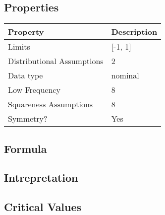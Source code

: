 \documentclass[11pt]{article}
\begin{document}
\subsection{Properties}
\begin{tabular}{| l || l |}
    \hline
    {\bf Property} & {\bf Description} \\
    \hline
    Limits & [-1, 1] \\ \hline

    Distributional Assumptions& 2 \\ \hline

    Data type & nominal \\ \hline

    Low Frequency & 8 \\ \hline

    Squareness Assumptions & 8 \\ \hline
    
    Symmetry? & Yes \\ \hline

\end{tabular}


\subsection{Formula}

\subsection{Intrepretation}

\subsection{Critical Values}
\end{document}
